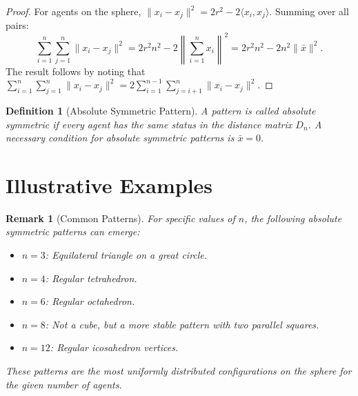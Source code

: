 \documentclass{ctexart}
\newtheorem{definition}[theorem]{Definition}
\newtheorem{remark}[theorem]{Remark}
\begin{document}
\begin{proof}
For agents on the sphere, $\|x_i - x_j\|^2 = 2r^2 - 2\langle x_i, x_j \rangle$.
Summing over all pairs:
\begin{equation}
\sum_{i=1}^{n} \sum_{j=1}^{n} \|x_i - x_j\|^2 = 2r^2 n^2 - 2\left\| \sum_{i=1}^{n} x_i \right\|^2 = 2r^2 n^2 - 2n^2 \|\bar{x}\|^2.
\end{equation}
The result follows by noting that $\sum_{i=1}^{n} \sum_{j=1}^{n} \|x_i - x_j\|^2 = 2 \sum_{i=1}^{n-1} \sum_{j=i+1}^{n} \|x_i - x_j\|^2$.
\end{proof}

\begin{definition}[Absolute Symmetric Pattern]
A pattern is called \textit{absolute symmetric} if every agent has the same status in the distance matrix $D_n$.
A necessary condition for absolute symmetric patterns is $\bar{x} = 0$.
\end{definition}

\section{Illustrative Examples}

\begin{remark}[Common Patterns]
For specific values of $n$, the following absolute symmetric patterns can emerge:
\begin{itemize}
    \item $n = 3$: Equilateral triangle on a great circle.
    \item $n = 4$: Regular tetrahedron.
    \item $n = 6$: Regular octahedron.
    \item $n = 8$: Not a cube, but a more stable pattern with two parallel squares.
    \item $n = 12$: Regular icosahedron vertices.
\end{itemize}
These patterns are the most uniformly distributed configurations on the sphere for the given number of agents.
\end{remark}
\end{document}
